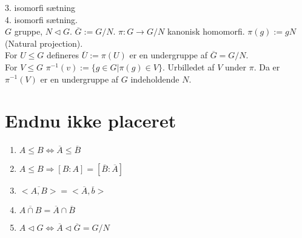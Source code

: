 \documentclass{article}
\begin{document}
3. isomorfi sætning\\

4. isomorfi sætning.\\
$G$ gruppe, $N \triangleleft G$. $\overline{G} := G / N$. $\pi : G \to G / N$ kanonisk homomorfi. $\pi(g) := g N$ (Natural projection).\\
For $U \leq G$ defineres $\overline{U} := \pi(U)$ er en undergruppe af $\overline{G} = G / N$.\\
For $V \leq G$ $\pi^{-1}(v) := \{ g \in G | \pi(g) \in V\}$. Urbilledet af $V$ under $\pi$. Da er $\pi^{-1}(V)$ er en undergruppe af $G$ indeholdende $N$.

\section*{Endnu ikke placeret}
\begin{enumerate}
  \item $A \leq B \iff \overline{A} \leq \overline{B}$
  \item $A \leq B \Rightarrow [B:A] = [\overline{B}:\overline{A}]$
  \item $\overline{<A, B>} = <\overline{A}, \overline{b}>$
  \item $\overline{A \cap B} = \overline{A} \cap \overline{B}$
  \item $A \triangleleft G \iff \overline{A} \triangleleft \overline{G} = G / N$
\end{enumerate}
\end{document}
